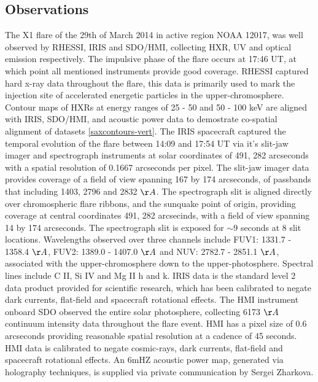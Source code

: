 \subsection{Observations}
The X1 flare of the 29th of March 2014 in active region NOAA 12017, was well observed by RHESSI, IRIS and SDO/HMI, collecting HXR, UV and optical emission respectively. The impulsive phase of the flare occurs at 17:46 UT, at which point all mentioned instruments provide good coverage. RHESSI captured hard x-ray data throughout the flare, this data is primarily used to mark the injection site of accelerated energetic particles in the upper-chromosphere. Contour maps of HXRs at energy ranges of 25 - 50 and 50 - 100 keV are aligned with IRIS, SDO/HMI, and acoustic power data to demostrate co-spatial alignment of datasets \ref{saxcontours-vert}. The IRIS spacecraft captured the temporal evolution of the flare between 14:09 and 17:54 UT via it's slit-jaw imager and spectrograph instruments at solar coordinates of 491, 282 arcseconds with a spatial resolution of 0.1667 arcseconds per pixel. The slit-jaw imager data provides coverage of a field of view spanning 167 by 174 arcseconds, of passbands that including 1403, 2796 and 2832 $\AA$. The spectrograph slit is aligned directly over chromospheric flare ribbons, and the sunquake point of origin, providing coverage at central coordinates 491, 282 arcsecinds, with a field of view spanning 14 by 174 arcseconds. The spectrograph slit is exposed for $\sim9$ seconds at 8 slit locations. Wavelengths observed over three channels include FUV1: 1331.7 - 1358.4 $\AA$, FUV2: 1389.0 - 1407.0 $\AA$ and NUV: 2782.7 - 2851.1 $\AA$, associated with the upper-chromosphere down to the upper-photosphere. Spectral lines include C II, Si IV and Mg II h and k. IRIS data is the standard level 2 data product provided for scientific research, which has been calibrated to negate dark currents, flat-field and spacecraft rotational effects. The HMI instrument onboard SDO observed the entire solar photosphere, collecting 6173 $\AA$ continuum intensity data throughout the flare event. HMI has a pixel size of 0.6 arcseconds providing reasonable spatial resolution at a cadence of 45 seconds. HMI data is calibrated to negate cosmic-rays, dark currents, flat-field and spacecraft rotational effects. An 6mHZ acoustic power map, generated via holography techniques, is supplied via private communication by Sergei Zharkova.

